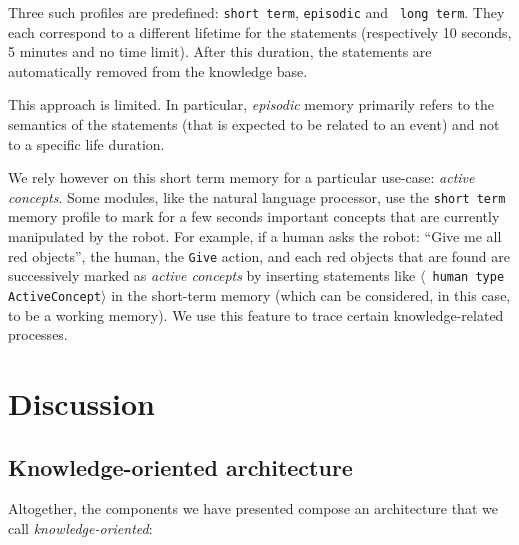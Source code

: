 \documentclass[letterpaper, 10 pt, conference]{ieeeconf}  %
\newcommand{\concept}[1]{{\small \texttt{#1}}}
\newcommand{\stmt}[1]{{\footnotesize \tt $\langle$ #1\relax$\rangle$}}
\begin{document}
Three such profiles are predefined: {\tt short term}, {\tt episodic} and {\tt
long term}. They each correspond to a different lifetime for the statements
(respectively 10 seconds, 5 minutes and no time limit). After this duration,
the statements are automatically removed from the knowledge base.

This approach is limited. In particular, \emph{episodic} memory primarily
refers to the semantics of the statements (that is expected to be related to an
event) and not to a specific life duration.

We rely however on this short term memory for a particular use-case:
\emph{active concepts}. Some modules, like the natural language processor, use
the {\tt short term} memory profile to mark for a few seconds important
concepts that are currently manipulated by the robot. For example, if a human
asks the robot: ``Give me all red objects'', the human, the \concept{Give}
action, and each red objects that are found are successively marked as
\emph{active concepts} by inserting statements like \stmt{human type
ActiveConcept} in the short-term memory (which can be considered, in this case,
to be a working memory). We use this feature to trace certain knowledge-related
processes.


\section{Discussion}
\label{sect|conclusion}


\subsection{Knowledge-oriented architecture}

Altogether, the components we have presented compose an architecture that we
call \emph{knowledge-oriented}:
\end{document}
